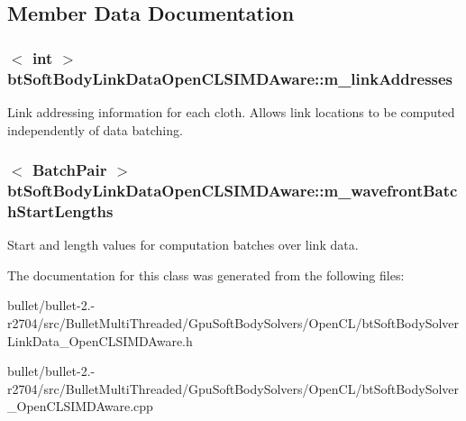 \subsection{Member Data Documentation}
\hypertarget{classbt_soft_body_link_data_open_c_l_s_i_m_d_aware_a9e083b3c7dc8384ddbd073bff540a406}{
\subsubsection[{m\+\_\+link\+Addresses}]{$<$ int $>$ bt\+Soft\+Body\+Link\+Data\+Open\+C\+L\+S\+I\+M\+D\+Aware\+::m\+\_\+link\+Addresses}}\label{classbt_soft_body_link_data_open_c_l_s_i_m_d_aware_a9e083b3c7dc8384ddbd073bff540a406}
Link addressing information for each cloth. Allows link locations to be computed independently of data batching. \hypertarget{classbt_soft_body_link_data_open_c_l_s_i_m_d_aware_a4c49f65f43a5eca3408ae17c0b3340c3}{
\subsubsection[{m\+\_\+wavefront\+Batch\+Start\+Lengths}]{$<$ {\bf Batch\+Pair} $>$ bt\+Soft\+Body\+Link\+Data\+Open\+C\+L\+S\+I\+M\+D\+Aware\+::m\+\_\+wavefront\+Batch\+Start\+Lengths}}\label{classbt_soft_body_link_data_open_c_l_s_i_m_d_aware_a4c49f65f43a5eca3408ae17c0b3340c3}
Start and length values for computation batches over link data. 

The documentation for this class was generated from the following files\+:\begin{DoxyCompactItemize}
\item 
bullet/bullet-\/2.-\/r2704/src/\+Bullet\+Multi\+Threaded/\+Gpu\+Soft\+Body\+Solvers/\+Open\+C\+L/bt\+Soft\+Body\+Solver\+Link\+Data\+\_\+\+Open\+C\+L\+S\+I\+M\+D\+Aware.\+h\item 
bullet/bullet-\/2.-\/r2704/src/\+Bullet\+Multi\+Threaded/\+Gpu\+Soft\+Body\+Solvers/\+Open\+C\+L/bt\+Soft\+Body\+Solver\+\_\+\+Open\+C\+L\+S\+I\+M\+D\+Aware.\+cpp\end{DoxyCompactItemize}
